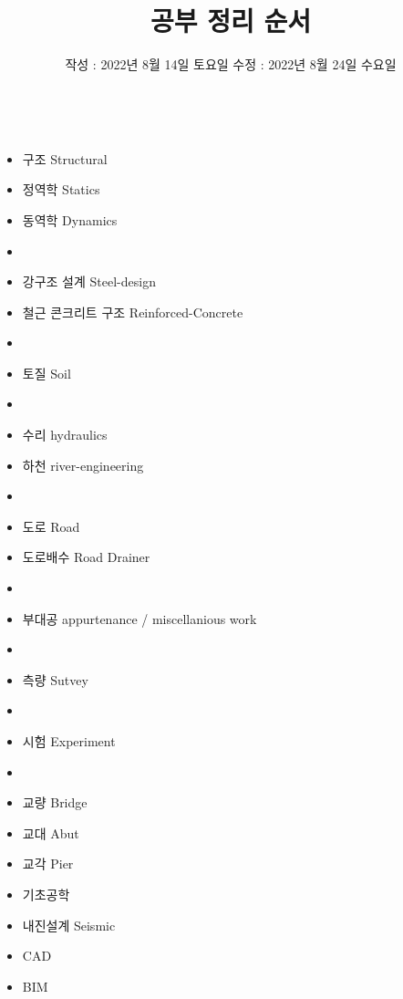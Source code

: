 \documentclass[	20pt, 
							a1paper, 
							landscape,
							margin=0mm, %
							innermargin=10mm,  		%
							blockverticalspace=4mm, %
							colspace=5mm, 
							subcolspace=0mm
							]{tikzposter}
\title{공부 정리 순서 }
\author{ 		작성 : 2022년 8월 14일 토요일  	수정 : 2022년 8월 24일 수요일 }
\begin{document}
	\maketitle[
					width=841mm,
					linewidth = 2mm,
					innersep=4mm,
					titletotopverticalspace=2mm, %
					titletoblockverticalspace=2mm, %
					titletextscale =4, 
				]


	\begin{columns}


			{
					\begin{itemize}
					\item 구조    Structural
					\item 정역학 Statics
					\item 동역학  Dynamics
					\item 
					\item 강구조 설계           Steel-design
					\item 철근 콘크리트 구조 Reinforced-Concrete
					\item
					\item 토질        Soil
					\item 
					\item 수리		hydraulics
					\item 하천    	river-engineering
					\item 
					\item 도로        Road
					\item 도로배수  Road Drainer
					\item 
					\item 부대공   appurtenance / miscellanious work
					\item 
					\item 측량  Sutvey 
					\item 
					\item 시험   Experiment
					\item 
					\item 교량   Bridge
					\item 교대   Abut
					\item 교각   Pier
					\item 기초공학
					\item 내진설계 Seismic
					\item CAD
					\item BIM
					\end{itemize}
			} %





\end{columns}
\end{document}
